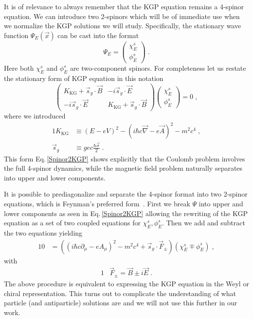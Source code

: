 \documentclass[epj]{svjour}
\begin{document}
It is of relevance to always remember that the KGP equation remains a 4-spinor equation. We can introduce two 2-spinors which will be of immediate use when we normalize the KGP solutions we will study. Specifically, the stationary wave function $\Psi_{E}(\vec x)$ can be cast into the format
\begin{equation}
\Psi_{E}=
\left(\begin{matrix}
 \chi_E^s\\[0.12cm]
 \phi_E^s
\end{matrix}\right)\;.
\label{Spinor1KGP}
\end{equation}
Here both $\chi_E^s$ and $\phi_E^s$ are two-component spinors. For completeness let us restate the stationary form of KGP equation in this notation
 \begin{equation}
\left(\begin{matrix}
K_\mathrm{KG}+ \vec s_g\cdot \vec B & -i\vec s_g\cdot \vec E\\
 -i\vec s_g\cdot \vec E & K_\mathrm{KG}+ \vec s_g\cdot \vec B 
\end{matrix}\right)
\left(\begin{matrix}
 \chi_E^s\\[0.12cm]
 \phi_E^s
\end{matrix}\right)
=0\;,
\label{Spinor2KGP}
\end{equation}
where we introduced
 \begin{alignat}{1}
K_\mathrm{KG}&\equiv (E-eV)^2-(i\hbar c\vec \nabla - e\vec A)^2-m^2c^4\;, \\
\vec s_g& \equiv ge c \frac{\hbar\vec \sigma}{2}\;.
\end{alignat}
This form Eq.\,\eqref{Spinor2KGP} shows explicitly that the Coulomb problem involves the full 4-spinor dynamics, while the magnetic field problem naturally separates into upper and lower components. 

It is possible to prediagonalize and separate the 4-spinor format into two 2-spinor equations, which is Feynman\rq s preferred form~\cite{Feynman:1958ty}. First we break $\Psi$ into upper and lower components as seen in Eq.\,\eqref{Spinor2KGP} allowing the rewriting of the KGP equation as a set of two coupled equations for $\chi^s_E, \phi^s_E $. Then we add and subtract the two equations yielding
\begin{alignat}{1}
\label{lan32} 0&\!=\!\left(\left(i\hbar c\partial_{\mu}-eA_{\mu}\right)^{2}\!\!-m^{2}c^{4}\!\! +\vec s_g\cdot\vec{F}_{\pm}\right)\left(\chi^s_E\mp \phi^s_E\right)\;,
\end{alignat} 
with\\[-1.cm]
\begin{alignat}{1}
\label{lan34}& \vec{F}_{\pm} =\vec{B}\pm i\vec{E}\;.
\end{alignat} 
The above procedure is equivalent to expressing the KGP equation in the Weyl or chiral representation. This turns out to complicate the understanding of what particle (and antiparticle) solutions are and we will not use this further in our work.
\end{document}
